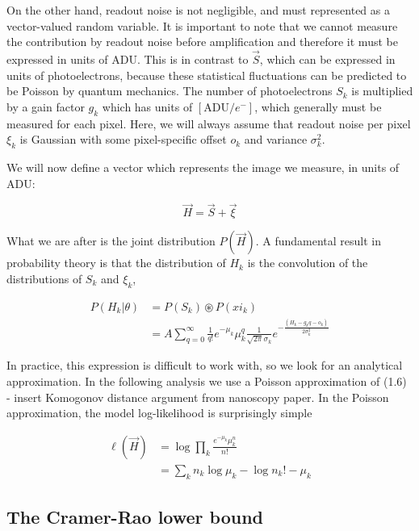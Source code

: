 \documentclass{ucetd}
\begin{document}
On the other hand, readout noise is not negligible, and must represented as a vector-valued random variable. It is important to note that we cannot measure the contribution by readout noise before amplification and therefore it must be expressed in units of $\mathrm{ADU}$. This is in contrast to $\vec{S}$, which can be expressed in units of photoelectrons, because these statistical fluctuations can be predicted to be Poisson by quantum mechanics. The number of photoelectrons $S_{k}$ is  multiplied by a gain factor $g_{k}$ which has units of $[\mathrm{ADU}/e^{-}]$, which generally must be measured for each pixel. Here, we will always assume that readout noise per pixel $\xi_{k}$ is Gaussian with some pixel-specific offset $o_{k}$ and variance $\sigma_{k}^{2}$. 

We will now define a vector which represents the image we measure, in units of ADU: 

\begin{equation}
\vec{H} = \vec{S} + \vec{\xi}
\end{equation}

What we are after is the joint distribution $P(\vec{H})$. A fundamental result in probability theory is that the distribution of $H_{k}$ is the convolution of the distributions of $S_{k}$ and $\xi_{k}$,

\begin{align*}
P(H_{k}|\theta) &= P(S_{k})\circledast P(xi_{k})\\
&= A\sum_{q=0}^{\infty} \frac{1}{q!}e^{-\mu_{k}}\mu_{k}^{q}\frac{1}{\sqrt{2\pi}\sigma_{k}}e^{-\frac{(H_{k}-g_{k}q-o_{k})}{2\sigma_{k}^{2}}}
\end{align*}

In practice, this expression is difficult to work with, so we look for an analytical approximation. In the following analysis we use a Poisson approximation of (1.6) - insert Komogonov distance argument from nanoscopy paper. In the Poisson approximation, the model log-likelihood is surprisingly simple

\begin{align*}
\ell(\vec{H}) &= \log \prod_{k} \frac{e^{-\mu_{k}}\mu_{k}^{n}}{n!}\\
&= \sum_{k} n_{k}\log\mu_{k} - \log n_{k}! - \mu_{k}
\end{align*}




\subsection{The Cramer-Rao lower bound}
\end{document}
